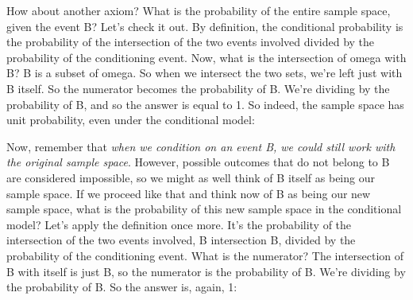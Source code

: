 \documentclass[pdftex, brazil, 12pt, twoside]{article}
\begin{document}
How about another axiom?
What is the probability of the entire sample space,
given the event B?
Let's check it out.
By definition, the conditional probability is the probability
of the intersection of the two events involved divided by the
probability of the conditioning event.
Now, what is the intersection of omega with B?
B is a subset of omega.
So when we intersect the two sets, we're
left just with B itself.
So the numerator becomes the probability of B. We're
dividing by the probability of B, and so the
answer is equal to 1.
So indeed, the sample space has unit probability, even
under the conditional model:

\begin{figure}[H]
  \begin{center}
  \end{center}
\end{figure}

Now, remember that \emph{when we condition on an event B, we
could still work with the original sample space}.
However, possible outcomes that do not belong to B are
considered impossible, so we might as well think of B
itself as being our sample space.
If we proceed like that and think now of B as being our
new sample space, what is the probability of this new sample
space in the conditional model?
Let's apply the definition once more.
It's the probability of the intersection of the two events
involved, B intersection B, divided by the probability of
the conditioning event.
What is the numerator?
The intersection of B with itself is just B, so the
numerator is the probability of B. We're dividing by the
probability of B. So the answer is, again, 1:

\begin{figure}[H]
  \begin{center}
  \end{center}
\end{figure}
\end{document}
